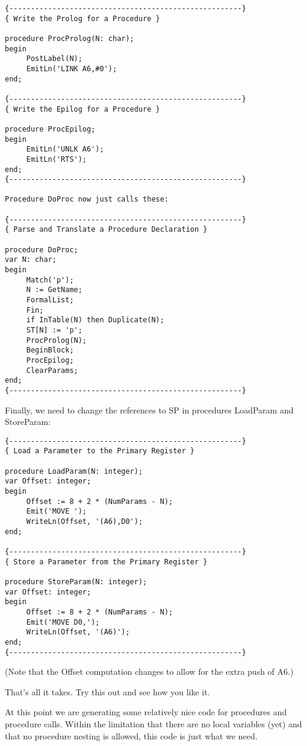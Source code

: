\begin{verbatim}
{------------------------------------------------------}
{ Write the Prolog for a Procedure }

procedure ProcProlog(N: char);
begin
     PostLabel(N);
     EmitLn('LINK A6,#0');
end;

{------------------------------------------------------}
{ Write the Epilog for a Procedure }

procedure ProcEpilog;
begin
     EmitLn('UNLK A6');
     EmitLn('RTS');
end;
{------------------------------------------------------}

Procedure DoProc now just calls these:

{------------------------------------------------------}
{ Parse and Translate a Procedure Declaration }

procedure DoProc;
var N: char;
begin
     Match('p');
     N := GetName;
     FormalList;
     Fin;
     if InTable(N) then Duplicate(N);
     ST[N] := 'p';
     ProcProlog(N);
     BeginBlock;
     ProcEpilog;
     ClearParams;
end;
{------------------------------------------------------}
\end{verbatim}

Finally, we need to  change  the  references  to SP in procedures LoadParam and StoreParam:

\begin{verbatim}
{------------------------------------------------------}
{ Load a Parameter to the Primary Register }

procedure LoadParam(N: integer);
var Offset: integer;
begin
     Offset := 8 + 2 * (NumParams - N);
     Emit('MOVE ');
     WriteLn(Offset, '(A6),D0');
end;

{------------------------------------------------------}
{ Store a Parameter from the Primary Register }

procedure StoreParam(N: integer);
var Offset: integer;
begin
     Offset := 8 + 2 * (NumParams - N);
     Emit('MOVE D0,');
     WriteLn(Offset, '(A6)');
end;
{------------------------------------------------------}
\end{verbatim}

(Note that the Offset computation  changes to allow for the extra push of A6.)

That's all it takes. Try this out and see how you like it.

At this point we  are  generating  some  relatively nice code for procedures and procedure calls. Within the limitation that there are no local variables  (yet)  and  that  no procedure nesting is allowed, this code is just what we need.

